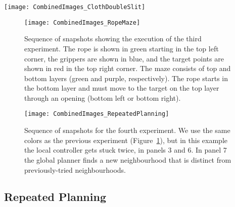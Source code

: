 \begin{figure*}[ht]
    \centering
    \texttt{[image: CombinedImages\_ClothDoubleSlit]}
    \vspace{-0.2in}
    \caption{Sequence of snapshots showing the execution of the second experiment. We use the same colors as the previous experiment (Figure~\ref{fig:cloth_single_pole}), but in this example instead of detecting future overstretch in panel (2), we detect that the system is stuck in a bad local minimum and unable to make progress.}
    \label{fig:cloth_double_slit}
\end{figure*}


\begin{figure}[ht]
    \centering
    \texttt{[image: CombinedImages\_RopeMaze]}
    \vspace{-2in}
    \caption{Sequence of snapshots showing the execution of the third experiment. The rope is shown in green starting in the top left corner, the grippers are shown in blue, and the target points are shown in red in the top right corner. The maze consists of top and bottom layers (green and purple, respectively). The rope starts in the bottom layer and must move to the target on the top layer through an opening (bottom left or bottom right).}
    \label{fig:rope_maze}
\end{figure}

\begin{figure}[ht]
    \centering
    \texttt{[image: CombinedImages\_RepeatedPlanning]}
    \vspace{-2in}
    \caption{Sequence of snapshots for the fourth experiment. We use the same colors as the previous experiment (Figure~\ref{fig:rope_maze}), but in this example the local controller gets stuck twice, in panels 3 and 6. In panel 7 the global planner finds a new neighbourhood that is distinct from previously-tried neighbourhoods.}
    \label{fig:repeated_planning}
\end{figure}





\subsection{Repeated Planning}



